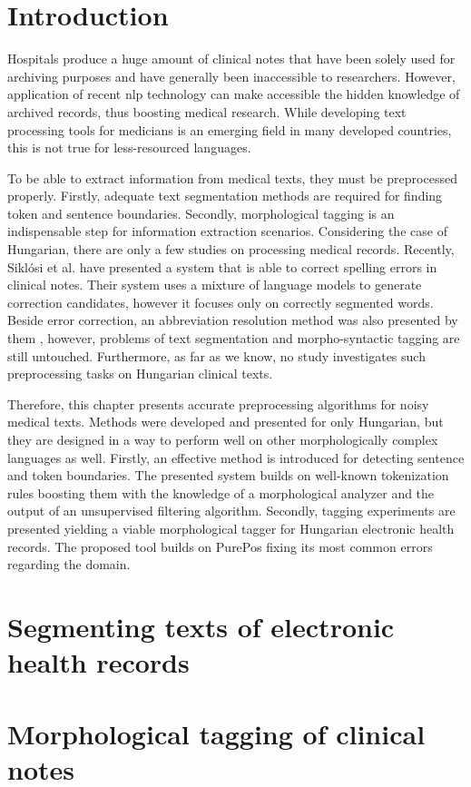 
\section{Introduction}

Hospitals produce a huge amount of clinical notes that have been solely used for archiving purposes and have generally been inaccessible to researchers. 
However, application of recent \acrshort{nlp} technology can make accessible the hidden knowledge of archived records, thus boosting medical research. 
While developing text processing tools for medicians is an emerging field in many developed countries, this is not true for less-resourced languages.

To be able to extract information from medical texts, they must be preprocessed properly. 
Firstly, adequate text segmentation methods 
are required for finding token and sentence boundaries. 
Secondly, morphological tagging is an indispensable step for information extraction scenarios. 
Considering the case of Hungarian, there are only a few studies on processing medical records. 
Recently, Siklósi et al. \cite{Siklosi2012,Siklosi2013} have presented a system that is able to correct spelling errors in clinical notes. 
Their system uses a mixture of language models to generate correction candidates, however it focuses only on correctly segmented words. 
Beside error correction, an abbreviation resolution method was also presented by them \cite{Siklosi2013b}, however, problems of text segmentation and  morpho-syntactic tagging are still untouched. 
Furthermore, as far as we know, no study investigates such preprocessing tasks on Hungarian clinical texts. 

Therefore, this chapter presents accurate preprocessing algorithms for noisy medical texts.
Methods were developed and presented for only Hungarian, but they are designed in a way to perform well on other morphologically complex languages as well. 
Firstly, an effective method is introduced for detecting sentence and token boundaries.
The presented system builds on well-known tokenization rules boosting them with the knowledge of a morphological analyzer and the output of an unsupervised filtering algorithm.
Secondly, tagging experiments are presented yielding a viable morphological tagger for Hungarian electronic health records. 
The proposed tool builds on PurePos fixing its most common errors regarding the domain.

\section{Segmenting texts of electronic health records}\label{sec:clin_segm}


\pagebreak

\section{Morphological tagging of clinical notes}\label{sec:clin_tag}


